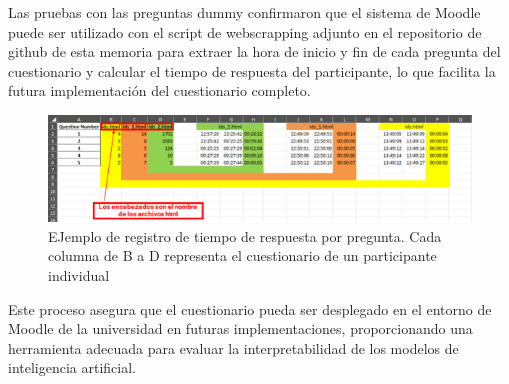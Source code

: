 Las pruebas con las preguntas dummy confirmaron que el sistema de Moodle puede ser utilizado con el script de webscrapping adjunto en el repositorio de github de esta memoria para extraer la hora de inicio y fin de cada pregunta del cuestionario y calcular el tiempo de respuesta del participante, lo que facilita la futura implementación del cuestionario completo.

\begin{figure}[h]
    \centering
    \includegraphics[width=0.9\linewidth]{include/resultados_excel.png}
    \caption{EJemplo de registro de tiempo de respuesta por pregunta. Cada columna de B a D representa el cuestionario de un participante individual}
    \label{fig:nasa-tlx-propio}
\end{figure}




Este proceso asegura que el cuestionario pueda ser desplegado en el entorno de Moodle de la universidad en futuras implementaciones, proporcionando una herramienta adecuada para evaluar la interpretabilidad de los modelos de inteligencia artificial.





 
